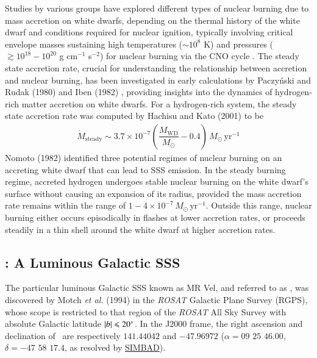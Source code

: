     Studies by various groups have explored different types of nuclear burning due to mass accretion on white dwarfs, depending on the thermal history of the white dwarf and conditions required for nuclear ignition, typically involving critical envelope masses %
    sustaining high temperatures ($\sim 10^8$ K) and pressures ($\gtrsim 10^{18}-10^{20}$ g cm$^{-1}$ s$^{-2}$) for nuclear burning via the CNO cycle \cite{paczynski78,prialnik78,sion79,sienkiewicz80,nomoto82,fujimoto82a,fujimoto82b,iben82,prialnik95,macdonald83}. The steady state accretion rate, crucial for understanding the relationship between accretion and nuclear burning, has been investigated in early calculations by Paczy\'{n}ski and Rudak (1980) \cite{paczynski80} and Iben (1982) \cite{iben82}, providing insights into the dynamics of hydrogen-rich matter accretion on white dwarfs. For a hydrogen-rich system, the steady state accretion rate was computed by Hachisu and Kato (2001) \cite{hachisu2001} to be
	\begin{align}
		\dot{M}_\text{steady}\sim 3.7\times 10^{-7}\left( \dfrac{M_\text{WD}}{M_\odot}-0.4 \right)\,M_\odot\,\text{yr}^{-1} \label{eqn:steady-mass-accr}
	\end{align}
	Nomoto (1982) \cite{nomoto82} identified three potential regimes of nuclear burning on an accreting white dwarf that can lead to SSS emission. In the steady burning regime, accreted hydrogen undergoes stable nuclear burning on the white dwarf's surface without causing an expansion of its radius, provided the mass accretion rate remains within the range of $1-4\times 10^{-7}\,M_\odot\,\text{yr}^{-1}$. Outside this range, nuclear burning either occurs episodically in flashes at lower accretion rates, or proceeds steadily in a thin shell around the white dwarf at higher accretion rates. %
	
	\subsection{\source: A Luminous Galactic SSS}
	The particular luminous Galactic SSS known as MR Vel, and referred to as \source, was discovered by Motch \textit{et al.} (1994) \cite{motch1994} in the \textit{ROSAT} Galactic Plane Survey (RGPS), whose scope is restricted to that region of the \textit{ROSAT} All Sky Survey \cite{voges1993rosat} with absolute Galactic latitude $|b|\leqslant 20\degree$. In the J2000 frame, the right ascension and declination of \source\ are respectively $141.44042$ and $-47.96972$ ($\alpha=09$ $25$ $46.00$, $\delta=-47$ $58$ $17.4$, as resolved by %
	\href{http://simbad.u-strasbg.fr/simbad/}{SIMBAD}).
	

